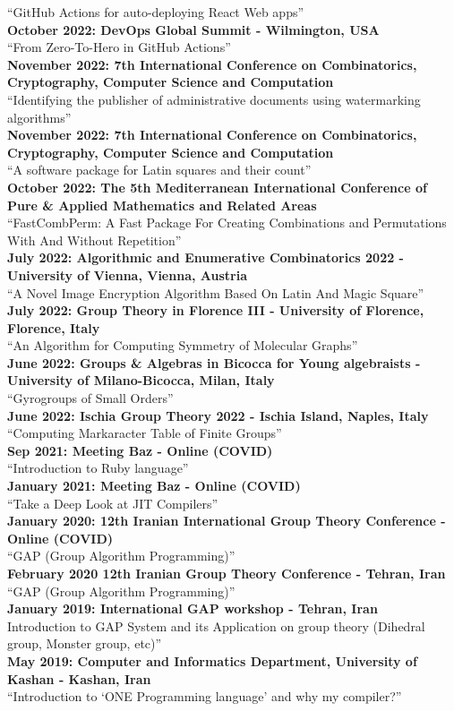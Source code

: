 \documentclass[a4paper,10pt]{article}
\begin{document}
“GitHub Actions for auto-deploying React Web apps”\\
\textbf{October 2022: DevOps Global Summit - Wilmington, USA}\\
“From Zero-To-Hero in GitHub Actions”\\
\textbf{November 2022: 7th International Conference on Combinatorics, Cryptography, Computer Science and Computation}\\
“Identifying the publisher of administrative documents using watermarking algorithms”\\
\textbf{November 2022: 7th International Conference on Combinatorics, Cryptography, Computer Science and Computation}\\
“A software package for Latin squares and their count”\\
\textbf{October 2022: The 5th Mediterranean International Conference of Pure \& Applied Mathematics and Related Areas}\\
“FastCombPerm: A Fast Package For Creating Combinations and Permutations With And Without Repetition”\\
\textbf{July 2022: Algorithmic and Enumerative Combinatorics 2022 - University of Vienna, Vienna, Austria}\\
“A Novel Image Encryption Algorithm Based On Latin And Magic Square”\\
\textbf{July 2022: Group Theory in Florence III - University of Florence, Florence, Italy}\\
“An Algorithm for Computing Symmetry of Molecular Graphs”\\
\textbf{June 2022: Groups \& Algebras in Bicocca for Young algebraists - University of Milano-Bicocca, Milan, Italy}\\
“Gyrogroups of Small Orders”\\
\textbf{June 2022: Ischia Group Theory 2022 - Ischia Island, Naples, Italy}\\
“Computing Markaracter Table of Finite Groups”\\
\textbf{Sep 2021: Meeting Baz - Online (COVID)}\\
“Introduction to Ruby language”\\
\textbf{January 2021: Meeting Baz - Online (COVID)}\\
“Take a Deep Look at JIT Compilers”\\
\textbf{January 2020: 12th Iranian International Group Theory Conference - Online (COVID)}\\
“GAP (Group Algorithm Programming)”\\
\textbf{February 2020 12th Iranian Group Theory Conference - Tehran, Iran}\\
“GAP (Group Algorithm Programming)”\\
\textbf{January 2019: International GAP workshop - Tehran, Iran}\\
Introduction to GAP System and its Application on group theory (Dihedral group, Monster group, etc)”\\
\textbf{May 2019: Computer and Informatics Department, University of Kashan - Kashan, Iran}\\
“Introduction to ‘ONE Programming language’ and why my compiler?”\\
\end{document}

